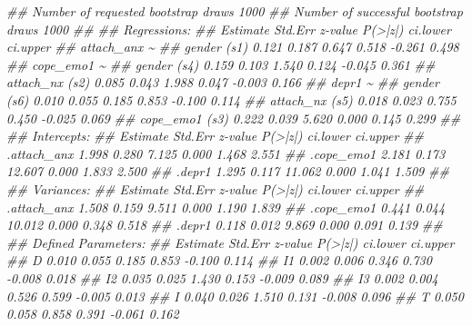 \documentclass[
  chinese-hans,
  letterpaper,
  DIV=11,
  numbers=noendperiod]{scrartcl}
\newenvironment{Shaded}{\begin{snugshade}}{\end{snugshade}}
\newcommand{\DocumentationTok}[1]{\textcolor[rgb]{0.37,0.37,0.37}{\textit{#1}}}
\begin{document}
\begin{Shaded}
\begin{Highlighting}[numbers=left,,]
\DocumentationTok{\#\#   Number of requested bootstrap draws             1000}
\DocumentationTok{\#\#   Number of successful bootstrap draws            1000}
\DocumentationTok{\#\# }
\DocumentationTok{\#\# Regressions:}
\DocumentationTok{\#\#                    Estimate  Std.Err  z{-}value  P(\textgreater{}|z|) ci.lower ci.upper}
\DocumentationTok{\#\#   attach\_anx \textasciitilde{}                                                          }
\DocumentationTok{\#\#     gender    (s1)    0.121    0.187    0.647    0.518   {-}0.261    0.498}
\DocumentationTok{\#\#   cope\_emo1 \textasciitilde{}                                                           }
\DocumentationTok{\#\#     gender    (s4)    0.159    0.103    1.540    0.124   {-}0.045    0.361}
\DocumentationTok{\#\#     attach\_nx (s2)    0.085    0.043    1.988    0.047   {-}0.003    0.166}
\DocumentationTok{\#\#   depr1 \textasciitilde{}                                                               }
\DocumentationTok{\#\#     gender    (s6)    0.010    0.055    0.185    0.853   {-}0.100    0.114}
\DocumentationTok{\#\#     attach\_nx (s5)    0.018    0.023    0.755    0.450   {-}0.025    0.069}
\DocumentationTok{\#\#     cope\_emo1 (s3)    0.222    0.039    5.620    0.000    0.145    0.299}
\DocumentationTok{\#\# }
\DocumentationTok{\#\# Intercepts:}
\DocumentationTok{\#\#                    Estimate  Std.Err  z{-}value  P(\textgreater{}|z|) ci.lower ci.upper}
\DocumentationTok{\#\#    .attach\_anx        1.998    0.280    7.125    0.000    1.468    2.551}
\DocumentationTok{\#\#    .cope\_emo1         2.181    0.173   12.607    0.000    1.833    2.500}
\DocumentationTok{\#\#    .depr1             1.295    0.117   11.062    0.000    1.041    1.509}
\DocumentationTok{\#\# }
\DocumentationTok{\#\# Variances:}
\DocumentationTok{\#\#                    Estimate  Std.Err  z{-}value  P(\textgreater{}|z|) ci.lower ci.upper}
\DocumentationTok{\#\#    .attach\_anx        1.508    0.159    9.511    0.000    1.190    1.839}
\DocumentationTok{\#\#    .cope\_emo1         0.441    0.044   10.012    0.000    0.348    0.518}
\DocumentationTok{\#\#    .depr1             0.118    0.012    9.869    0.000    0.091    0.139}
\DocumentationTok{\#\# }
\DocumentationTok{\#\# Defined Parameters:}
\DocumentationTok{\#\#                    Estimate  Std.Err  z{-}value  P(\textgreater{}|z|) ci.lower ci.upper}
\DocumentationTok{\#\#     D                 0.010    0.055    0.185    0.853   {-}0.100    0.114}
\DocumentationTok{\#\#     I1                0.002    0.006    0.346    0.730   {-}0.008    0.018}
\DocumentationTok{\#\#     I2                0.035    0.025    1.430    0.153   {-}0.009    0.089}
\DocumentationTok{\#\#     I3                0.002    0.004    0.526    0.599   {-}0.005    0.013}
\DocumentationTok{\#\#     I                 0.040    0.026    1.510    0.131   {-}0.008    0.096}
\DocumentationTok{\#\#     T                 0.050    0.058    0.858    0.391   {-}0.061    0.162}
\end{Highlighting}
\end{Shaded}
\end{document}
